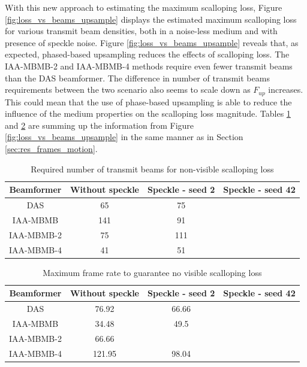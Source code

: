 With this new approach to estimating the maximum scalloping loss, Figure \ref{fig:loss_vs_beams_upsample} displays the estimated maximum scalloping loss for various transmit beam densities, both in a noise-less medium and with presence of speckle noise. 
Figure \ref{fig:loss_vs_beams_upsample} reveals that, as expected, phased-based upsampling reduces the effects of scalloping loss. The IAA-MBMB-2 and IAA-MBMB-4 methods require even fewer transmit beams than the DAS beamformer. The difference in number of transmit beams requirements between the two scenario also seems to scale down as $F_{up}$ increases. This could mean that the use of phase-based upsampling is able to reduce the influence of the medium properties on the scalloping loss magnitude.
Tables \ref{table:num_beams_upsample} and \ref{table:frame_rate_upsample} are summing up the information from Figure \ref{fig:loss_vs_beams_upsample} in the same manner as in Section \ref{sec:res_frames_motion}.

\begin{table}[!ht]
\centering
\begin{tabular}{| c | c | c | c |}
  \hline
  Beamformer &   Without speckle   &   Speckle - seed 2 &   Speckle - seed 42 \\
  \hline
  DAS           &   65      &   75  &    \\
  IAA-MBMB      &   141     &   91  &    \\
  IAA-MBMB-2    &   75     &    111 &    \\
  IAA-MBMB-4    &   41     &    51  &    \\
  \hline
 \end{tabular}
\caption{Required number of transmit beams for non-visible scalloping loss}
\label{table:num_beams_upsample}
\end{table}

\begin{table}[!ht]
\centering
\begin{tabular}{| c | c | c | c |}
  \hline
  Beamformer &   Without speckle   &    Speckle - seed 2 &   Speckle - seed 42 \\
  \hline
  DAS           &   76.92      &   66.66  &    \\
  IAA-MBMB      &   34.48     &   49.5  &    \\
  IAA-MBMB-2    &   66.66     &         &    \\
  IAA-MBMB-4    &   121.95     &  98.04 &    \\
  \hline
 \end{tabular}
\caption{Maximum frame rate to guarantee no visible scalloping loss}
\label{table:frame_rate_upsample}
\end{table}

